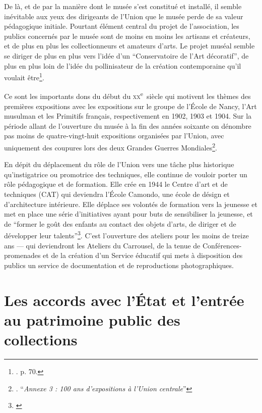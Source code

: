 \vspace{1em}



 

De là, et de par la manière dont le musée s'est constitué et installé, il semble inévitable aux yeux des dirigeants de l'Union que le musée perde de sa valeur pédagogique initiale. Pourtant élément central du projet de l'association, les publics concernés par le musée sont de moins en moins les artisans et créateurs, et de plus en plus les collectionneurs et amateurs d'arts. Le projet muséal semble se diriger de plus en plus vers l'idée d'un \enquote{Conservatoire de l'Art décoratif}, de plus en plus loin de l'idée du pollinisateur de la création contemporaine qu'il voulait être\footnote{\cite{brunhammer_beau_1992}. p. 70.}. 

Ce sont les importants dons du début du \textsc{xx}\textsuperscript{e}~siècle qui motivent les thèmes des premières expositions avec les expositions sur le groupe de l'École de Nancy, l'Art musulman et les Primitifs français, respectivement en 1902, 1903 et 1904. Sur la période allant de l'ouverture du musée à la fin des années soixante on dénombre pas moins de quatre-vingt-huit expositions organisées par l'Union, avec uniquement des coupures lors des deux Grandes Guerres Mondiales\footnote{\cite{noauthor__1970}. \enquote{\textit{Annexe 3 : 100 ans d'expositions à l'Union centrale}}}.

En dépit du déplacement du rôle de l'Union vers une tâche plus historique qu'instigatrice ou promotrice des techniques, elle continue de vouloir porter un rôle pédagogique et de formation. Elle crée en 1944 le Centre d'art et de techniques (CAT) qui deviendra l'École Camondo, une école de désign et d'architecture intérieure. Elle déplace ses volontés de formation vers la jeunesse et met en place une série d'initiatives ayant pour buts de sensibiliser la jeunesse, et de \enquote{former le goût des enfants au contact des objets d'arts, de diriger et de développer leur talents}\footnote{\cite{noauthor__1970}}. C'est l'ouverture des ateliers pour les moins de treize ans — qui deviendront les Ateliers du Carrousel, de la tenue de Conférences-promenades et de la création d'un Service éducatif qui mets à disposition des publics un service de documentation et de reproductions photographiques. 

\section{Les accords avec l'État et l'entrée au patrimoine public des collections}

